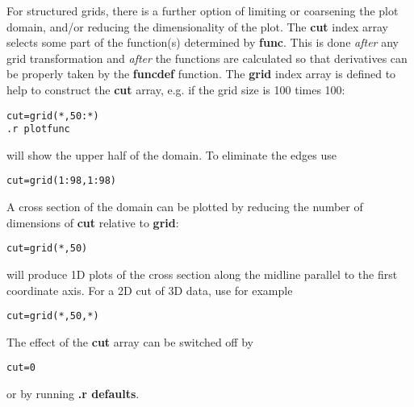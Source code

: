    For structured grids, there is a further option of limiting or coarsening
   the plot domain, and/or reducing the dimensionality of the plot.
   The {\bf cut} index array selects some part of the function(s)
   determined by {\bf func}.
   This is done {\em after} any grid transformation and {\em after} 
   the functions are calculated so that derivatives can be properly taken 
   by the {\bf funcdef} function.
   The {\bf grid} index array is defined to help to construct
   the {\bf cut} array, e.g. if the grid size is 100 times 100:
\begin{verbatim}
cut=grid(*,50:*)
.r plotfunc
\end{verbatim}
   will show the upper half of the domain. To eliminate the edges use
\begin{verbatim}
cut=grid(1:98,1:98)
\end{verbatim}
   A cross section of the domain can be plotted by reducing
   the number of dimensions of {\bf cut} relative to {\bf grid}:
\begin{verbatim}
cut=grid(*,50)
\end{verbatim}
   will produce 1D plots of the cross section along the midline parallel to 
   the first coordinate axis. For a 2D cut of 3D data, use for example
\begin{verbatim}
cut=grid(*,50,*)
\end{verbatim}
   The effect of the {\bf cut} array can be switched off by 
\begin{verbatim}
cut=0
\end{verbatim}
   or by running {\bf .r defaults}.


